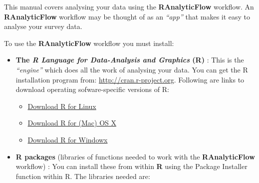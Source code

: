 \documentclass[12pt,a4paper]{book}
\theoremstyle{definition}
\theoremstyle{definition}
\theoremstyle{definition}
\theoremstyle{remark}
\begin{document}
This manual covers analysing your data using the \textbf{RAnalyticFlow}
workflow. An \textbf{RAnalyticFlow} workflow may be thought of as an
\emph{``app''} that makes it easy to analyse your survey data.

To use the \textbf{RAnalyticFlow} workflow you must install:

\begin{itemize}
\item
  \textbf{The \emph{R Language for Data-Analysis and Graphics} (R)} :
  This is the \emph{``engine''} which does all the work of analysing
  your data. You can get the R installation program from:
  \url{http://cran.r-project.org}. Following are links to download
  operating sofware-specific versions of R:

  \begin{itemize}
  \item
    \href{https://cran.r-project.org/bin/linux/}{Download R for Linux}
  \item
    \href{https://cran.r-project.org/bin/macosx/}{Download R for (Mac)
    OS X}
  \item
    \href{https://cran.r-project.org/bin/windows/}{Download R for
    Windowx}
  \end{itemize}
\item
  \textbf{R packages} (libraries of functions needed to work with the
  \textbf{RAnalyticFlow} workflow) : You can install these from within
  \textbf{R} using the Package Installer function within R. The
  libraries needed are:
\end{itemize}
\end{document}
